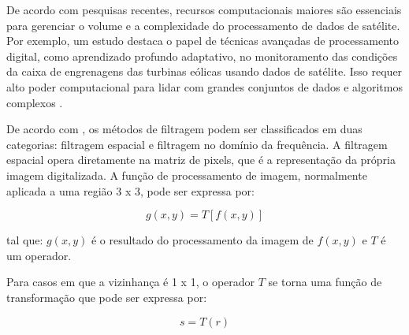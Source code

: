 \documentclass[
    12pt,                   %
    openright,              %
    oneside,                %
    a4paper,                %
    sumario=tradicional,    %
    english,                %
    brazil,                 %
    ]{abntex2}
\begin{document}
    De acordo com pesquisas recentes, recursos computacionais maiores são essenciais para gerenciar o volume e a complexidade do processamento de dados de satélite. Por exemplo, um estudo destaca o papel de técnicas avançadas de processamento digital, como aprendizado profundo adaptativo, no monitoramento das condições da caixa de engrenagens das turbinas eólicas usando dados de satélite. Isso requer alto poder computacional para lidar com grandes conjuntos de dados e algoritmos complexos \cite{s24082481}.
       
   
    De acordo com \textcite{marques1999processamento}, os métodos de filtragem podem ser classificados em duas categorias: filtragem espacial e filtragem no domínio da frequência. A filtragem espacial opera diretamente na matriz de pixels, que é a representação da própria imagem digitalizada. A função de processamento de imagem, normalmente aplicada a uma região 3 x 3, pode ser expressa por:
    
    \begin{equation}
        g(x,y)=T[f(x,y)] 
    \end{equation}

    tal que: \begin{math}g(x,y)\end{math} é o resultado do processamento da imagem de \begin{math}f(x,y)\end{math} e \begin{math}T\end{math} é um operador.

    Para casos em que a vizinhança é 1 x 1, o operador \begin{math}T\end{math} se torna uma função de transformação que pode ser expressa por:

    \begin{equation}
        s = T(r) 
    \end{equation}
    
\end{document}
